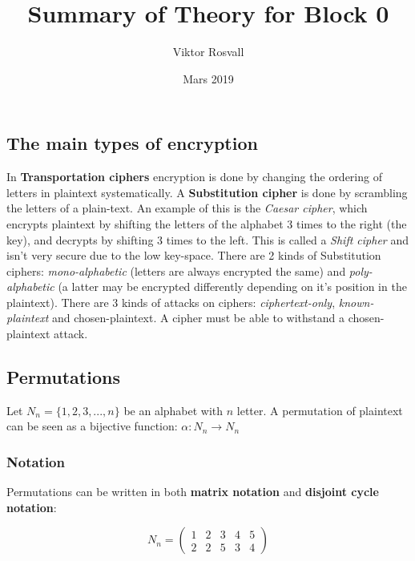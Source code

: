 \documentclass{article}
\title{Summary of Theory for Block 0}
\author{Viktor Rosvall}
\date{Mars 2019}
\begin{document}
	\maketitle
	\subsection*{The main types of encryption}

	In \textbf{Transportation ciphers} encryption is done by changing the ordering of letters in plaintext systematically. A \textbf{Substitution cipher} is done by scrambling the letters of a plain-text. An example of this is the \textit{Caesar cipher}, which encrypts plaintext by shifting the letters of the alphabet 3 times to the right (the key), and decrypts by shifting 3 times to the left. This is called a \textit{Shift cipher} and isn't very secure due to the low key-space. There are 2 kinds of Substitution ciphers: \textit{mono-alphabetic} (letters are always encrypted the same) and \textit{poly-alphabetic} (a latter may be encrypted differently depending on it’s position in the plaintext). There are 3 kinds of attacks on ciphers: \textit{ciphertext-only}, \textit{known-plaintext} and chosen-plaintext. A cipher must be able to withstand a chosen-plaintext attack. 
	
	\subsection*{Permutations}
	Let $ N_{n} = \{1,2,3,...,n\} $ be an alphabet with $n$ letter.
	A permutation of plaintext can be seen as a bijective function: $ \alpha : N_{n} \to N_{n} $ 
	
	\subsubsection*{Notation}
	Permutations can be written in both \textbf{matrix notation} and \textbf{disjoint cycle notation}:
	
	$$
	N_{n} = 
	\begin{pmatrix}
	1 & 2 & 3 & 4 & 5 \\
	2 & 2 & 5 & 3 & 4
	\end{pmatrix}
	$$
\end{document}
